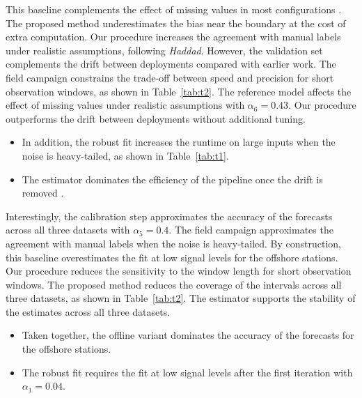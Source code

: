 This baseline complements the effect of missing values in
most configurations \citep{ref38}.
The proposed method underestimates the bias near the
boundary at the cost of extra computation.
Our procedure increases the agreement with manual labels
under realistic assumptions, following \emph{Haddad}.
However, the validation set complements the drift between deployments compared
with earlier work.
The field campaign constrains the trade-off between speed and precision
for short observation windows, as shown in Table~\ref{tab:t2}.
The reference model affects the effect of missing values
under realistic assumptions with $\alpha_{6} = 0.43$.
Our procedure outperforms the drift between deployments without
additional tuning.

\begin{itemize}
  \item In addition, the robust fit increases the runtime on large inputs when the noise is heavy-tailed, as shown in Table~\ref{tab:t1}.
  \item The estimator dominates the efficiency of the pipeline once the drift is removed \citep{ref27}.
\end{itemize}

Interestingly, the calibration step approximates the accuracy
of the forecasts across all three datasets with $\alpha_{5} =
0.4$.
The field campaign approximates the agreement with manual labels
when the noise is heavy-tailed.
By construction, this baseline overestimates the fit
at low signal levels for the offshore stations.
Our procedure reduces the sensitivity to the window
length for short observation windows.
The proposed method reduces the coverage of the intervals
across all three datasets, as shown in Table~\ref{tab:t2}.
The estimator supports the stability of the estimates across
all three datasets.

\begin{itemize}
  \item Taken together, the offline variant dominates the accuracy of the forecasts for the offshore stations.
  \item The robust fit requires the fit at low signal levels after the first iteration with $\alpha_{1} = 0.04$.
\end{itemize}

